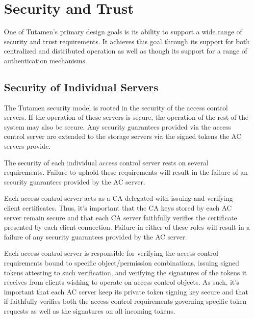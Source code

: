 \section{Security and Trust}
\label{sec:trust}

One of Tutamen's primary design goals is its ability to support a wide
range of security and trust requirements. It achieves this goal
through its support for both centralized and distributed operation as
well as though its support for a range of authentication mechanisms.

\subsection{Security of Individual Servers}

The Tutamen security model is rooted in the security of the access
control servers. If the operation of these servers is secure, the
operation of the rest of the system may also be secure. Any security
guarantees provided via the access control server are extended to the
storage servers via the signed tokens the AC servers provide.

The security of each individual access control server rests on several
requirements. Failure to uphold these requirements will result in the
failure of an security guarantees provided by the AC server.

\begin{packed_desc}
\item[Certificate Authority Role:] Each access control server acts as
  a CA delegated with issuing and verifying client certificates. Thus,
  it's important that the CA keys stored by each AC server remain
  secure and that each CA server faithfully verifies the certificate
  presented by each client connection. Failure in either of these
  roles will result in a failure of any security guarantees provided
  by the AC server.
\item[Token Issuance and Verification:] Each access control server is
  responsible for verifying the access control requirements bound to
  specific object/permission combinations, issuing signed tokens
  attesting to such verification, and verifying the signatures of the
  tokens it receives from clients wishing to operate on access control
  objects. As such, it's important that each AC server keep its
  private token signing key secure and that if faithfully verifies
  both the access control requirements governing specific token
  requests as well as the signatures on all incoming tokens.
\end{packed_desc}

